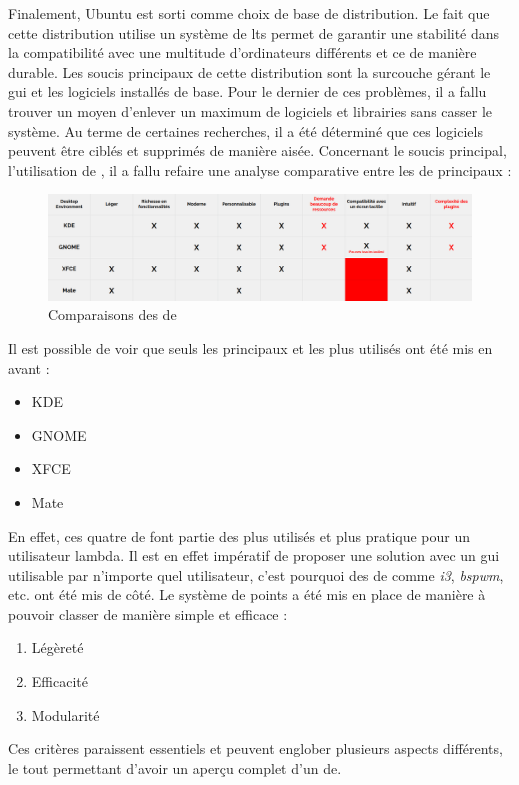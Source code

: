 Finalement, Ubuntu est sorti comme choix de base de distribution. 
Le fait que cette distribution utilise un système de \acrfull{lts} permet de garantir une stabilité dans la compatibilité avec une multitude d'ordinateurs différents et ce de manière durable.
Les soucis principaux de cette distribution sont la surcouche \textit{} gérant le \acrfull{gui} et les logiciels installés de base.
Pour le dernier de ces problèmes, il a fallu trouver un moyen d'enlever un maximum de logiciels et librairies sans casser le système.
Au terme de certaines recherches, il a été déterminé que ces logiciels peuvent être ciblés et supprimés de manière aisée.
\newline
Concernant le soucis principal, l'utilisation de , il a fallu refaire une analyse comparative entre les \acrfull{de} principaux :
\begin{figure}[H]
	\centering
	\includegraphics[scale=0.25]{images/DE_comp.png}
	\caption{Comparaisons des \acrfull{de}}
	\label{fig:de_comp}
\end{figure}
Il est possible de voir que seuls les principaux et les plus utilisés ont été mis en avant :	
\begin{itemize}
    \item KDE
    \item GNOME
    \item XFCE
    \item Mate
\end{itemize}
En effet, ces quatre \acrshort{de} font partie des plus utilisés et plus pratique pour un utilisateur lambda.
Il est en effet impératif de proposer une solution avec un \acrshort{gui} utilisable par n'importe quel utilisateur, c'est pourquoi des \acrshort{de} comme \textit{i3}, \textit{bspwm}, etc. ont été mis de côté.
Le système de points a été mis en place de manière à pouvoir classer de manière simple et efficace :
\begin{enumerate}
    \item Légèreté
    \item Efficacité
    \item Modularité
\end{enumerate}
Ces critères paraissent essentiels et peuvent englober plusieurs aspects différents, le tout permettant d'avoir un aperçu complet d'un \acrshort{de}.
